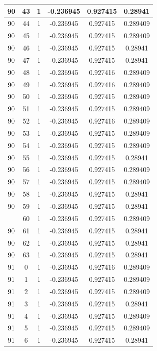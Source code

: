 \documentclass[12pt,a4paper]{article}
\numberwithin{equation}{section}
\numberwithin{figure}{section}
\numberwithin{table}{section}
\begin{document}
\begin{longtable}{|c|c|c|c|c|c|}
90 & 43 & 1 & -0.236945 & 0.927415 & 0.28941 \\ \hline
90 & 44 & 1 & -0.236945 & 0.927415 & 0.289409 \\ \hline
90 & 45 & 1 & -0.236945 & 0.927415 & 0.289409 \\ \hline
90 & 46 & 1 & -0.236945 & 0.927415 & 0.28941 \\ \hline
90 & 47 & 1 & -0.236945 & 0.927415 & 0.28941 \\ \hline
90 & 48 & 1 & -0.236945 & 0.927416 & 0.289409 \\ \hline
90 & 49 & 1 & -0.236945 & 0.927416 & 0.289409 \\ \hline
90 & 50 & 1 & -0.236945 & 0.927415 & 0.289409 \\ \hline
90 & 51 & 1 & -0.236945 & 0.927415 & 0.289409 \\ \hline
90 & 52 & 1 & -0.236945 & 0.927416 & 0.289409 \\ \hline
90 & 53 & 1 & -0.236945 & 0.927415 & 0.289409 \\ \hline
90 & 54 & 1 & -0.236945 & 0.927415 & 0.289409 \\ \hline
90 & 55 & 1 & -0.236945 & 0.927415 & 0.28941 \\ \hline
90 & 56 & 1 & -0.236945 & 0.927415 & 0.289409 \\ \hline
90 & 57 & 1 & -0.236945 & 0.927415 & 0.289409 \\ \hline
90 & 58 & 1 & -0.236945 & 0.927415 & 0.28941 \\ \hline
90 & 59 & 1 & -0.236945 & 0.927415 & 0.28941 \\ \hline
\pagebreak
90 & 60 & 1 & -0.236945 & 0.927415 & 0.289409 \\ \hline
90 & 61 & 1 & -0.236945 & 0.927415 & 0.28941 \\ \hline
90 & 62 & 1 & -0.236945 & 0.927415 & 0.28941 \\ \hline
90 & 63 & 1 & -0.236945 & 0.927415 & 0.28941 \\ \hline
91 & 0 & 1 & -0.236945 & 0.927416 & 0.289409 \\ \hline
91 & 1 & 1 & -0.236945 & 0.927415 & 0.289409 \\ \hline
91 & 2 & 1 & -0.236945 & 0.927415 & 0.289409 \\ \hline
91 & 3 & 1 & -0.236945 & 0.927415 & 0.28941 \\ \hline
91 & 4 & 1 & -0.236945 & 0.927415 & 0.289409 \\ \hline
91 & 5 & 1 & -0.236945 & 0.927415 & 0.289409 \\ \hline
91 & 6 & 1 & -0.236945 & 0.927415 & 0.28941 \\ \hline

\end{longtable}
\end{document}

